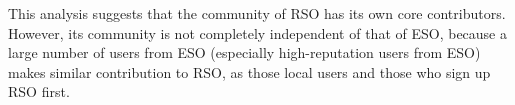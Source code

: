 This analysis suggests that the community of RSO has its own core contributors.
However, its community is not completely independent of that of ESO, because a large number of users from ESO (especially high-reputation users from ESO) makes similar contribution to RSO, as those local users and those who sign up RSO first.	

